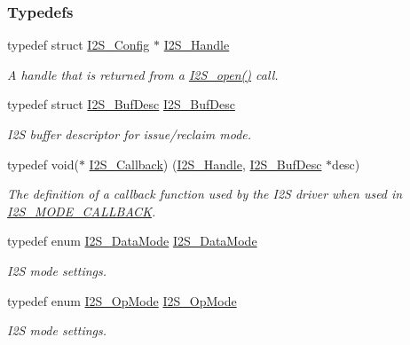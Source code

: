 \subsubsection*{Typedefs}
\begin{DoxyCompactItemize}
\item 
typedef struct \hyperlink{struct_i2_s___config}{I2\+S\+\_\+\+Config} $\ast$ \hyperlink{_i2_s_8h_aff0fad1efd0d9dc3c8d2cc87e73cd5a0}{I2\+S\+\_\+\+Handle}
\begin{DoxyCompactList}\small\item\em A handle that is returned from a \hyperlink{_i2_s_8h_aad4ce7cbdf38dc5597f5a92ad056ebc1}{I2\+S\+\_\+open()} call. \end{DoxyCompactList}\item 
typedef struct \hyperlink{struct_i2_s___buf_desc}{I2\+S\+\_\+\+Buf\+Desc} \hyperlink{_i2_s_8h_a749d6d0d5339bfb54246e0b301016312}{I2\+S\+\_\+\+Buf\+Desc}
\begin{DoxyCompactList}\small\item\em I2\+S buffer descriptor for issue/reclaim mode. \end{DoxyCompactList}\item 
typedef void($\ast$ \hyperlink{_i2_s_8h_af87c5d43590153717044a932ff6b2e03}{I2\+S\+\_\+\+Callback}) (\hyperlink{_i2_s_8h_aff0fad1efd0d9dc3c8d2cc87e73cd5a0}{I2\+S\+\_\+\+Handle}, \hyperlink{struct_i2_s___buf_desc}{I2\+S\+\_\+\+Buf\+Desc} $\ast$desc)
\begin{DoxyCompactList}\small\item\em The definition of a callback function used by the I2\+S driver when used in \hyperlink{_i2_s_8h_a120b8555bc048186bbd436dbdbb5b405a2c7b409c7185250bef51c0e6de600d08}{I2\+S\+\_\+\+M\+O\+D\+E\+\_\+\+C\+A\+L\+L\+B\+A\+C\+K}. \end{DoxyCompactList}\item 
typedef enum \hyperlink{_i2_s_8h_a120b8555bc048186bbd436dbdbb5b405}{I2\+S\+\_\+\+Data\+Mode} \hyperlink{_i2_s_8h_ad634bdf621a2f3f626b3cce0e67f659a}{I2\+S\+\_\+\+Data\+Mode}
\begin{DoxyCompactList}\small\item\em I2\+S mode settings. \end{DoxyCompactList}\item 
typedef enum \hyperlink{_i2_s_8h_a1eb065ff9040979c9d6586c8d0df9ee0}{I2\+S\+\_\+\+Op\+Mode} \hyperlink{_i2_s_8h_a932b2a114f3c9cfd64af554ff3b4496a}{I2\+S\+\_\+\+Op\+Mode}
\begin{DoxyCompactList}\small\item\em I2\+S mode settings. \end{DoxyCompactList}\item 

\end{DoxyCompactItemize}
